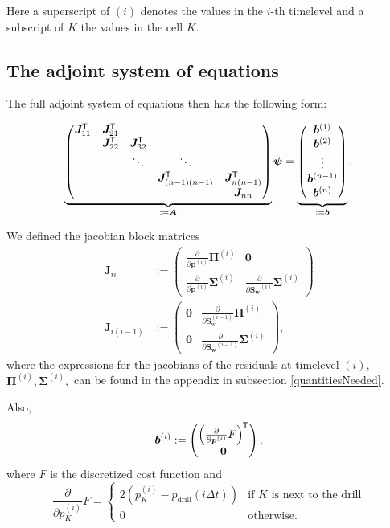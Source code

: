 \documentclass[twoside]{IEEEtran}
\newcommand*{\pdiff}[2]{\ensuremath{\frac{\partial}{\partial{#2}}{#1}}}
\renewcommand*{\vec}[1]{\ensuremath{{\bm{#1}}}}
\newcommand*{\mat}[1]{\vec{#1}}
\newcommand*{\transpose}[1]{{#1}^{\mkern-1.5mu\mathsf{T}}}
\newcommand*{\tvec}[1]{\transpose{\vec{#1}}}
\newcommand*{\tmat}[1]{\tvec{#1}}
\begin{document}
Here a superscript of $(i)$ denotes the values in the $i$-th timelevel and a subscript of $K$ the values in the cell $K$.


\subsection{The adjoint system of equations}
The full adjoint system of equations then has the following form:

\begin{equation}
\underbrace{\begin{pmatrix}
\tmat{J}_{11} & \tmat{J}_{21} & & &  \\
& \tmat{J}_{22} & \tmat{J}_{32} & &  \\
& & \ddots & \ddots &  \\
& & &  \tmat{J}_{(n-1)(n-1)} &  \tmat{J}_{n(n-1)}  \\
& & &                                         & \mat{J}_{nn}
\end{pmatrix}}_{ := \mat{A}}\vec{\psi} = \underbrace{\begin{pmatrix} \vec{b}^{(1)} \\ \vec{b}^{(2)} \\ \vdots \\ \vec{b}^{(n-1)} \\ \vec{b}^{(n)} \end{pmatrix}}_{:= \vec{b}}.
\end{equation}

We defined the jacobian block matrices
\begin{align}
\mat{J}_{ii} &:= \begin{pmatrix}\pdiff{\vec{\Pi}^{(i)}}{\vec{p}^{(i)}} & \mat{0}\\ \pdiff{\vec{\Sigma}^{(i)}}{\vec{p}^{(i)}} & \pdiff{\vec{\Sigma}^{(i)}}{\vec{S_\text{w}}^{(i)}}\end{pmatrix} \\
\mat{J}_{i(i-1)} &:= \begin{pmatrix} \mat{0} & \pdiff{\mat{\Pi}^{(i)}}{\vec{S}_\text{w}^{(i-1)}}\\ \mat{0} & \pdiff{\vec{\Sigma}^{(i)}}{\vec{S_\text{w}}^{(i-1)}}\end{pmatrix},
\end{align}
where the expressions for the jacobians of the residuals at timelevel $(i)$, $\mat{\Pi}^{(i)}, \mat{\Sigma}^{(i)},$ can be found in the appendix in subsection \ref{quantitiesNeeded}.

Also,
\begin{equation}
\vec{b}^{(i)} := \begin{pmatrix} \transpose{\left(\pdiff{F}{\vec{p}^{(i)}}\right)} \\ \vec{0} \end{pmatrix},
\end{equation}
where $F$ is the discretized cost function and 
\begin{equation}
\pdiff{F}{{p}^{(i)}_K} = \begin{cases} 2(p_K^{(i)} - p_\text{drill}(i\Delta t)) & \text{if $K$ is next to the drill} \\ 0 & \text{otherwise.} \end{cases}
\end{equation}
\end{document}
